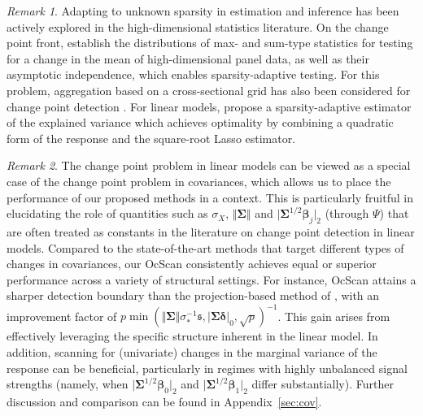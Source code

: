 \documentclass[11pt, a4paper]{article}
\theoremstyle{definition}
\theoremstyle{definition}
\theoremstyle{definition}
\theoremstyle{definition}
\theoremstyle{definition}
\theoremstyle{remark}
\newtheorem{rem}{Remark}[section]
\theoremstyle{definition}
\theoremstyle{definition}
\theoremstyle{definition}
\begin{document}
\begin{rem}
Adapting to unknown sparsity in estimation and inference has been actively explored in the high-dimensional statistics literature.
On the change point front, \cite{wang2023computationally} establish the distributions of max- and sum-type statistics for testing for a change in the mean of high-dimensional panel data, as well as their asymptotic independence, which enables sparsity-adaptive testing. 
For this problem, aggregation based on a cross-sectional grid has also been considered for change point detection \citep{enikeeva2019high, liu2021minimax, pilliat2023optimal, kovacs2024optimistic, moen2024efficient}.
For linear models, \cite{VeGa18} propose a sparsity-adaptive estimator of the explained variance which achieves optimality by combining a quadratic form of the response and the square-root Lasso estimator. 
\end{rem}

\begin{rem}\label{r:comp:covar}
The change point problem in linear models can be viewed as a special case of the change point problem in covariances, which allows us to place the performance of our proposed methods in a context. This is particularly fruitful in elucidating the role of quantities such as $\sigma_X$, $\Vert \bm\Sigma \Vert$ and $\vert \bm\Sigma^{1/2} \bm\beta_j\vert_2$ (through $\Psi$) that are often treated as constants in the literature on change point detection in linear models.
Compared to the state-of-the-art methods \citep{wang2021optimal, DePaYa22, moen2024minimax} that target different types of changes in covariances, our OcScan consistently achieves equal or superior performance across a variety of structural settings. For instance, OcScan attains a sharper detection boundary than the projection-based method of \citet{wang2021optimal}, with an improvement factor of $p\min(\Vert \bm\Sigma \Vert \sigma_*^{-1} \mathfrak{s}, \vert \bm\Sigma \bm\delta \vert_0, \sqrt{p})^{-1}$. This gain arises from effectively leveraging the specific structure inherent in the linear model. 
In addition, scanning for (univariate) changes in the marginal variance of the response can be beneficial, particularly in regimes with highly unbalanced signal strengths (namely, when $\lvert \bm\Sigma^{1/2}\bm\beta_0\rvert_2$ and $\lvert \bm\Sigma^{1/2}\bm\beta_1\rvert_2$ differ substantially).
Further discussion and comparison can be found in Appendix~\ref{sec:cov}.
\end{rem}
\end{document}
